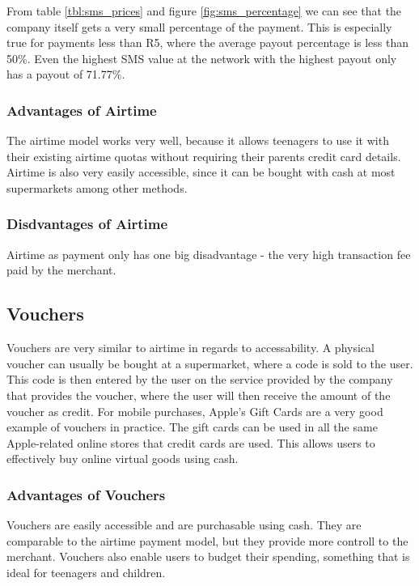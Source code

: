 From table \ref{tbl:sms_prices} and figure \ref{fig:sms_percentage} we can see that the company itself gets a very small percentage of the payment. This is especially true for payments less than R5, where the average payout percentage is less than 50\%. Even the highest SMS value at the network with the highest payout only has a payout of 71.77\%.

\subsubsection{Advantages of Airtime}

The airtime model works very well, because it allows teenagers to use it with their existing airtime quotas without requiring their parents credit card details. Airtime is also very easily accessible, since it can be bought with cash at most supermarkets among other methods. 

\subsubsection{Disdvantages of Airtime}

Airtime as payment only has one big disadvantage - the very high transaction fee paid by the merchant. 


\subsection{Vouchers}

Vouchers are very similar to airtime in regards to accessability. A physical voucher can usually be bought at a supermarket, where a code is sold to the user. This code is then entered by the user on the service provided by the company that provides the voucher, where the user will then receive the amount of the voucher as credit. For mobile purchases, Apple's Gift Cards are a very good example of vouchers in practice. The gift cards can be used in all the same Apple-related online stores that credit cards are used. This allows users to effectively buy online virtual goods using cash.

\subsubsection{Advantages of Vouchers}

Vouchers are easily accessible and are purchasable using cash. They are comparable to the airtime payment model, but they provide more controll to the merchant. Vouchers also enable users to budget their spending, something that is ideal for teenagers and children.


